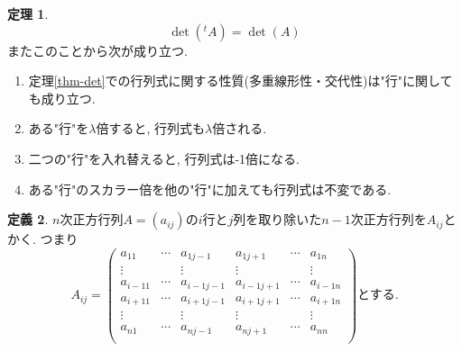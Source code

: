 \documentclass[dvipdfmx,a4paper,11pt]{article}
\theoremstyle{definition}
\newtheorem{thm}{定理}
\newtheorem{dfn}[thm]{定義}
\begin{document}
\begin{tcolorbox}[
    colback = white,
    colframe = green!35!black,
    fonttitle = \bfseries,
    breakable = true]
    \begin{thm}\cite[命題3.4]{M}
    $$
    \det({}^t A)=\det(A)
    $$
  またこのことから次が成り立つ. 
    \begin{enumerate}
    \setlength{\parskip}{0cm} 
  \setlength{\itemsep}{0cm}
  \item 定理\ref{thm-det}での行列式に関する性質(多重線形性・交代性)は"行"に関しても成り立つ. 
 \item  ある"行"を$\lambda$倍すると, 行列式も$\lambda$倍される.
 \item 二つの"行"を入れ替えると, 行列式は-1倍になる. 
 \item ある"行"のスカラー倍を他の"行"に加えても行列式は不変である. 
 \end{enumerate}
  \end{thm}
  \end{tcolorbox}
  
  
  \begin{tcolorbox}[
    colback = white,
    colframe = green!35!black,
    fonttitle = \bfseries,
    breakable = true]
    \begin{dfn}
    $n$次正方行列$A=(a_{ij})$の$i$行と$j$列を取り除いた$n-1$次正方行列を$A_{ij}$とかく.
    つまり
  $$
  A_{ij}
  =
    \begin{pmatrix}
a_{11}&   \cdots &a_{1j-1}&a_{1j+1}&\cdots&a_{1n} \\
\vdots&   		& \vdots &\vdots &   		&\vdots  \\
a_{i-11}&   \cdots &a_{i-1j-1}&a_{i-1j+1}&\cdots&a_{i-1n} \\
a_{i+11}&   \cdots &a_{i+1j-1}&a_{i+1j+1}&\cdots&a_{i+1n} \\
\vdots&   		& \vdots &\vdots &   		&\vdots  \\
a_{n1}&   \cdots &a_{nj-1}&a_{nj+1}&\cdots&a_{nn} \\
\end{pmatrix}
\text{とする.}
$$
    \end{dfn}
 \end{tcolorbox}
 
\end{document}
